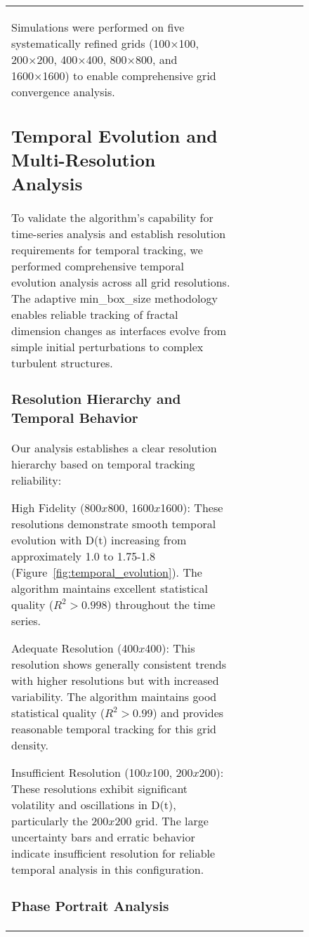 \documentclass[preprint,12pt]{elsarticle}
\def\textbf#1{#1}%
\def\times{x}%
\begin{document}
\begin{figure}[ht]
\begin{table}[ht]
\begin{tabular}{|l|c|c|c|c|c|c|}
Simulations were performed on five systematically refined grids (100×100, 200×200, 400×400, 800×800, and 1600×1600) to enable comprehensive grid convergence analysis.

\subsection{Temporal Evolution and Multi-Resolution Analysis}
\label{subsec:temporal_evolution}

To validate the algorithm's capability for time-series analysis and establish resolution requirements for temporal tracking, we performed comprehensive temporal evolution analysis across all grid resolutions. The adaptive min\_box\_size methodology enables reliable tracking of fractal dimension changes as interfaces evolve from simple initial perturbations to complex turbulent structures.

\subsubsection{Resolution Hierarchy and Temporal Behavior}

Our analysis establishes a clear resolution hierarchy based on temporal tracking reliability:

\textbf{High Fidelity (800$\times$800, 1600$\times$1600):} These resolutions demonstrate smooth temporal evolution with D(t) increasing from approximately 1.0 to 1.75-1.8 (Figure~\ref{fig:temporal_evolution}). The algorithm maintains excellent statistical quality ($R^2 > 0.998$) throughout the time series.

\textbf{Adequate Resolution (400$\times$400):} This resolution shows generally consistent trends with higher resolutions but with increased variability. The algorithm maintains good statistical quality ($R^2 > 0.99$) and provides reasonable temporal tracking for this grid density.

\textbf{Insufficient Resolution (100$\times$100, 200$\times$200):} These resolutions exhibit significant volatility and oscillations in D(t), particularly the 200$\times$200 grid. The large uncertainty bars and erratic behavior indicate insufficient resolution for reliable temporal analysis in this configuration.

\subsubsection{Phase Portrait Analysis}


\end{tabular}
\end{table}
\end{figure}
\end{document}
